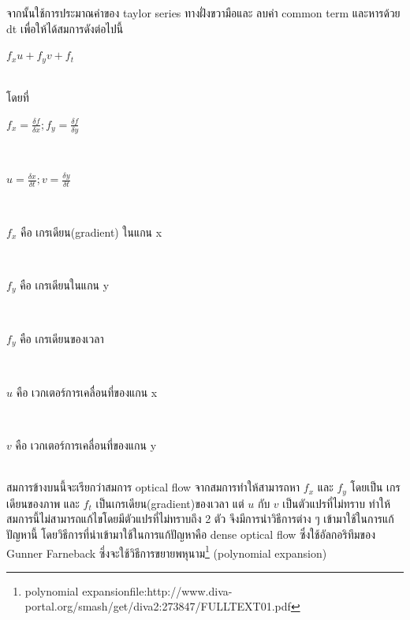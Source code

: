 จากนั้นใช้การประมาณค่าของ taylor series ทางฝั่งขวามือและ ลบค่า common term และหารด้วย dt เพื่อให้ได้สมการดังต่อไปนี้
\\
\centerline{$f_{x}u + f_{y}v + f_{t} $}				\\
โดยที่
\\
\centerline{$f_{x} = \frac{\delta f}{\delta x} ; f_{y} = \frac{\delta f}{\delta y}$} 	\\
\centerline{$u = \frac{\delta x}{\delta t} ; v = \frac{\delta y}{\delta t}$}	 	\\
\centerline{$f_{x}$ คือ เกรเดียน(gradient) ในแกน x} 		\\
\centerline{$f_{y}$ คือ เกรเดียนในแกน y} 		\\
\centerline{$f_{y}$ คือ เกรเดียนของเวลา} 		\\
\centerline{$u$ คือ เวกเตอร์การเคลื่อนที่ของแกน x} 	\\
\centerline{$v$ คือ เวกเตอร์การเคลื่อนที่ของแกน y} 	\\

สมการข้างบนนี้จะเรียกว่าสมการ optical flow จากสมการทำให้สามารถหา $f_{x}$ และ $f_{y}$ โดยเป็น เกรเดียนของภาพ และ  $f_{t}$ เป็นเกรเดียน(gradient)ของเวลา แต่ $u$ กับ $v$ เป็นตัวแปรที่ไม่ทราบ ทำให้สมการนี้ไม่สามารถแก้ไขโดยมีตัวแปรที่ไม่ทราบถึง 2 ตัว จึงมีการนำวิธีการต่าง ๆ เข้ามาใช้ในการแก้ปัญหานี้ โดยวิธีการที่นำเข้ามาใช้ในการแก้ปัญหาคือ dense optical flow ซึ่งใช้อัลกอริทึมของ Gunner Farneback ซึ่งจะใช้วิธีการขยายพหุนาม\footnote{polynomial expansionfile:http://www.diva-portal.org/smash/get/diva2:273847/FULLTEXT01.pdf} (polynomial expansion)

